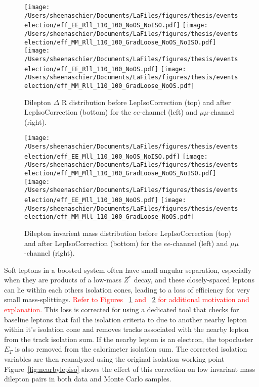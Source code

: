   \begin{figure}[tbp]
     \texttt{[image: /Users/sheenaschier/Documents/LaFiles/figures/thesis/eventselection/eff\_EE\_Rll\_110\_100\_NoOS\_NoISO.pdf]}
       \texttt{[image: /Users/sheenaschier/Documents/LaFiles/figures/thesis/eventselection/eff\_MM\_Rll\_110\_100\_GradLoose\_NoOS\_NoISO.pdf]}\\
     \texttt{[image: /Users/sheenaschier/Documents/LaFiles/figures/thesis/eventselection/eff\_EE\_Rll\_110\_100\_NoOS.pdf]}
     \texttt{[image: /Users/sheenaschier/Documents/LaFiles/figures/thesis/eventselection/eff\_MM\_Rll\_110\_100\_GradLoose\_NoOS.pdf]}\\
   \caption{Dilepton $\Delta$ R distribution before LepIsoCorrection (top) and after LepIsoCorrection (bottom) for the $ee$-channel (left) and $\mu\mu$-channel (right).}
   \label{fig:EffRll_ISOCorr}
 \end{figure}

  \begin{figure}[tbp]
     \texttt{[image: /Users/sheenaschier/Documents/LaFiles/figures/thesis/eventselection/eff\_EE\_Mll\_110\_100\_NoOS\_NoISO.pdf]}
       \texttt{[image: /Users/sheenaschier/Documents/LaFiles/figures/thesis/eventselection/eff\_MM\_Mll\_110\_100\_GradLoose\_NoOS\_NoISO.pdf]}\\
     \texttt{[image: /Users/sheenaschier/Documents/LaFiles/figures/thesis/eventselection/eff\_EE\_Mll\_110\_100\_NoOS.pdf]}
     \texttt{[image: /Users/sheenaschier/Documents/LaFiles/figures/thesis/eventselection/eff\_MM\_Mll\_110\_100\_GradLoose\_NoOS.pdf]}\\
   \caption{Dilepton invarient mass distribution before LepIsoCorrection (top) and after LepIsoCorrection (bottom) for the $ee$-channel (left) and $\mu\mu$-channel (right).}
   \label{fig:EffMll_ISOCorr}
 \end{figure}
 Soft leptons in a boosted system often have small angular separation, especially when they are products of a low-mass $Z^*$ decay, and these closely-spaced leptons can lie within each others isolation cones, leading to a loss of efficiency for very small mass-splittings.  \textcolor{red}{Refer to Figures~ \ref{fig:EffRll_ISOCorr} and ~\ref{fig:EffMll_ISOCorr} for additional motivation and explanation.}  This loss is corrected for using a dedicated tool that checks for baseline leptons that fail the isolation criteria to due to another nearby lepton within it's isolation cone and removes tracks associated with the nearby lepton from the track isolation sum.  If the nearby lepton is an electron, the topocluster $E_T$ is also removed from the calorimeter isolation sum.  The corrected isolation variables are then reanalyzed using the original isolation working point  Figure~\ref{fig:nearbylepiso} shows the effect of this correction on low invariant mass dilepton pairs in both data and Monte Carlo samples.



